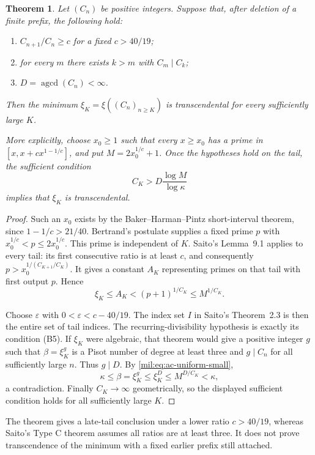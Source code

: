 \documentclass[11pt,a4paper]{article}
\newtheorem{theorem}{Theorem}[section]
\theoremstyle{definition}
\theoremstyle{remark}
\numberwithin{equation}{section}
\begin{document}
\begin{theorem}\label{mil:thm:ac-tail}
Let $(C_n)$ be positive integers. Suppose that, after deletion of a
finite prefix, the following hold:
\begin{enumerate}
\item $C_{n+1}/C_n\ge c$ for a fixed $c>40/19$;
\item for every $m$ there exists $k>m$ with $C_m\mid C_k$;
\item $D=\operatorname{agcd}(C_n)<\infty$.
\end{enumerate}
Then the minimum $\xi_K=\xi((C_n)_{n\ge K})$ is transcendental for
every sufficiently large $K$.

More explicitly, choose $x_0\ge1$ such that every $x\ge x_0$ has a
prime in $[x,x+cx^{1-1/c}]$, and put $M=2x_0^{1/c}+1$.
Once the hypotheses hold on the tail, the sufficient condition
\[
 C_K>D\frac{\log M}{\log\kappa}
\]
implies that $\xi_K$ is transcendental.
\end{theorem}
\begin{proof}
Such an $x_0$ exists by the Baker--Harman--Pintz short-interval theorem,
since $1-1/c>21/40$. Bertrand's postulate supplies a fixed prime
$p$ with $x_0^{1/c}<p\le2x_0^{1/c}$. This prime is independent of
$K$. Saito's Lemma~9.1 applies to every tail: its first consecutive
ratio is at least $c$, and consequently
$p>x_0^{1/(C_{K+1}/C_K)}$. It gives a constant $A_K$ representing
primes on that tail with first output $p$. Hence
\begin{equation}\label{mil:eq:ac-uniform-small}
 \xi_K\le A_K<(p+1)^{1/C_K}\le M^{1/C_K}.
\end{equation}

Choose $\varepsilon$ with $0<\varepsilon<c-40/19$. The index set
$I$ in Saito's Theorem~2.3 is then the entire set of tail indices.
The recurring-divisibility hypothesis is exactly its condition
(B5). If $\xi_K$ were algebraic, that theorem would give a positive
integer $g$ such that $\beta=\xi_K^g$ is a Pisot number of degree
at least three and $g\mid C_n$ for all sufficiently large $n$.
Thus $g\mid D$. By \eqref{mil:eq:ac-uniform-small},
\[
 \kappa\le\beta=\xi_K^g\le\xi_K^D
 \le M^{D/C_K}<\kappa,
\]
a contradiction. Finally $C_K\to\infty$ geometrically, so the
displayed sufficient condition holds for all sufficiently large $K$.
\end{proof}

The theorem gives a late-tail conclusion under a lower ratio
$c>40/19$, whereas Saito's Type C theorem assumes all ratios are
at least three. It does not prove transcendence of the minimum
with a fixed earlier prefix still attached.
\end{document}

